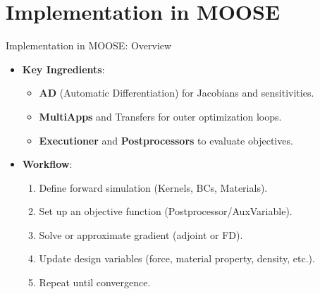 \documentclass[10pt,aspectratio=169]{beamer}
\begin{document}
\section{Implementation in MOOSE}
\begin{frame}{Implementation in MOOSE: Overview}
    \begin{itemize}
        \item \textbf{Key Ingredients}:
        \begin{itemize}
            \item \textbf{AD} (Automatic Differentiation) for Jacobians and sensitivities.
            \item \textbf{MultiApps} and Transfers for outer optimization loops.
            \item \textbf{Executioner} and \textbf{Postprocessors} to evaluate objectives.
        \end{itemize}
        \item \textbf{Workflow}:
        \begin{enumerate}
            \item Define forward simulation (Kernels, BCs, Materials).
            \item Set up an objective function (Postprocessor/AuxVariable).
            \item Solve or approximate gradient (adjoint or FD).
            \item Update design variables (force, material property, density, etc.).
            \item Repeat until convergence.
        \end{enumerate}
    \end{itemize}
\end{frame}
\end{document}
